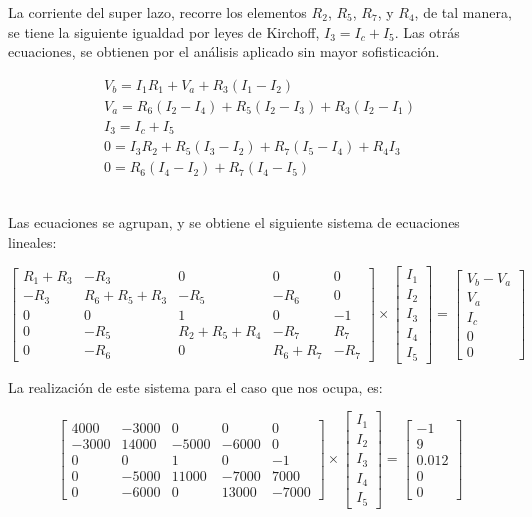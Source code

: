 \documentclass[11pt, spanish]{article}
\begin{document}
\begin{enumerate}
La corriente del super lazo, recorre los elementos $R_2$, $R_5$, $R_7$, y $R_4$, de tal manera, se tiene la siguiente igualdad por leyes de Kirchoff, $I_3 = I_c + I_5$. Las otrás ecuaciones, se obtienen por el análisis aplicado sin mayor sofisticación.

\begin{align*}
V_b = I_1 R_1 + V_a + R_3(I_1 - I_2)\\
V_a = R_6(I_2 - I_4) + R_5(I_2 - I_3) + R_3(I_2 - I_1)\\
I_3 = I_c + I_5\\
0 = I_3R_2 + R_5(I_3 - I_2) + R_7(I_5 - I_4) + R_4 I_3\\
0 = R_6(I_4 - I_2) + R_7(I_4 - I_5)
\end{align*}\

Las ecuaciones se agrupan, y se obtiene el siguiente sistema de ecuaciones lineales:

\[
\begin{bmatrix}
    R_1 + R_3 & -R_3 & 0 & 0  & 0 \\
    -R_3 & R_6 + R_5 + R_3 & -R_5 & -R_6  & 0 \\
    0 & 0 & 1 & 0  & -1 \\
    0 & -R_5 & R_2 + R_5 + R_4 & -R_7  & R_7 \\
    0 & -R_6 & 0 & R_6 + R_7  & -R_7
\end{bmatrix} \times \begin{bmatrix}
    I_1 \\
    I_2 \\
    I_3 \\
    I_4 \\
    I_5
\end{bmatrix} = \begin{bmatrix}
    V_b - V_a \\
    V_a \\
    I_c \\
    0 \\
    0
\end{bmatrix}
\]

La realización de este sistema para el caso que nos ocupa, es:

\[
\begin{bmatrix}
    4000 & -3000 & 0 & 0  & 0 \\
    -3000 & 14000 & -5000 & -6000  & 0 \\
    0 & 0 & 1 & 0  & -1 \\
    0 & -5000 & 11000 & -7000  & 7000 \\
    0 & -6000 & 0 & 13000  & -7000
\end{bmatrix} \times \begin{bmatrix}
    I_1 \\
    I_2 \\
    I_3 \\
    I_4 \\
    I_5
\end{bmatrix} = \begin{bmatrix}
    -1 \\
    9 \\
    0.012 \\
    0 \\
    0
\end{bmatrix}
\]


\end{enumerate}
\end{document}
